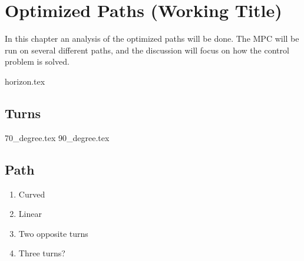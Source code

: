 \chapter{Optimized Paths (Working Title)}


In this chapter an analysis of the optimized paths will be done. The MPC will be run on several different paths, and the discussion will focus on how the control problem is solved.

{horizon.tex}

\section{Turns}
{70_degree.tex}
{90_degree.tex}


\section{Path}

\begin{enumerate}
	\item Curved
	\item Linear
	\item Two opposite turns
	\item Three turns?
\end{enumerate}


